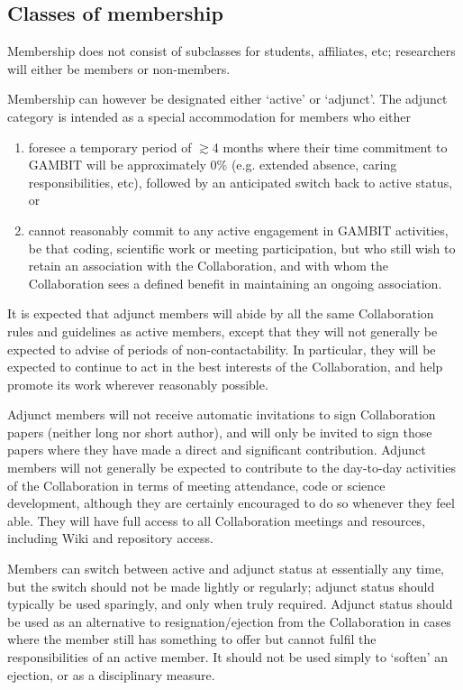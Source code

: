 \subsection{Classes of membership}

Membership does not consist of subclasses for students, affiliates, etc; researchers will either be members or non-members.

Membership can however be designated either `active' or `adjunct'.  The adjunct category is intended as a special accommodation for members who either
\begin{enumerate}
\item foresee a temporary period of $\gtrsim$4 months where their time commitment to GAMBIT will be approximately 0\% (e.g. extended absence, caring responsibilities, etc), followed by an anticipated switch back to active status, or
\item cannot reasonably commit to any active engagement in GAMBIT activities, be that coding, scientific work or meeting participation, but who still wish to retain an association with the Collaboration, and with whom the Collaboration sees a defined benefit in maintaining an ongoing association.
\end{enumerate}
It is expected that adjunct members will abide by all the same Collaboration rules and guidelines as active members, except that they will not generally be expected to advise of periods of non-contactability.  In particular, they will be expected to continue to act in the best interests of the Collaboration, and help promote its work wherever reasonably possible.

Adjunct members will not receive automatic invitations to sign Collaboration papers (neither long nor short author), and will only be invited to sign those papers where they have made a direct and significant contribution.  Adjunct members will not generally be expected to contribute to the day-to-day activities of the Collaboration in terms of meeting attendance, code or science development, although they are certainly encouraged to do so whenever they feel able.  They will have full access to all Collaboration meetings and resources, including Wiki and repository access.

Members can switch between active and adjunct status at essentially any time, but the switch should not be made lightly or regularly; adjunct status should typically be used sparingly, and only when truly required.  Adjunct status should be used as an alternative to resignation/ejection from the Collaboration in cases where the member still has something to offer but cannot fulfil the responsibilities of an active member.  It should not be used simply to `soften' an ejection, or as a disciplinary measure.

